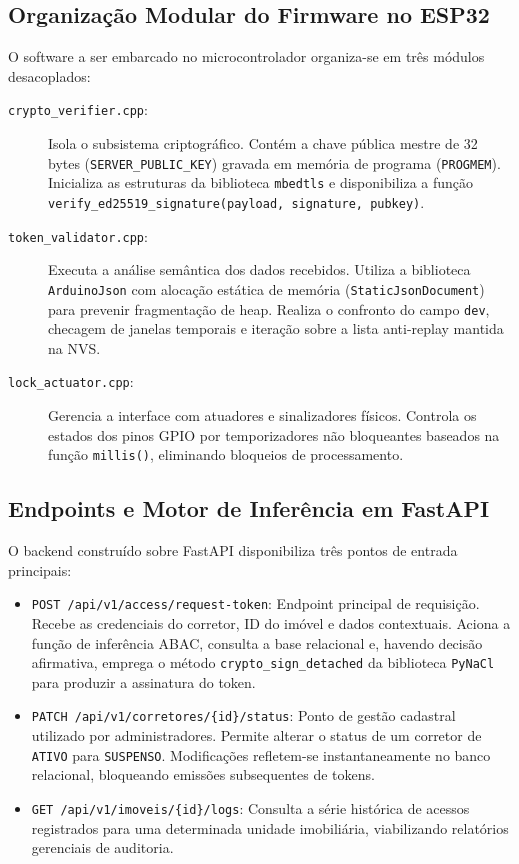 \subsection{Organização Modular do Firmware no ESP32}
\label{subsec:modulos-firmware}

O software a ser embarcado no microcontrolador organiza-se em três módulos desacoplados:

\begin{description}
    \item[\texttt{crypto\_verifier.cpp}:] Isola o subsistema criptográfico. Contém a chave pública mestre de 32 bytes (\texttt{SERVER\_PUBLIC\_KEY}) gravada em memória de programa (\texttt{PROGMEM}). Inicializa as estruturas da biblioteca \texttt{mbedtls} e disponibiliza a função \texttt{verify\_ed25519\_signature(payload, signature, pubkey)}.
    \item[\texttt{token\_validator.cpp}:] Executa a análise semântica dos dados recebidos. Utiliza a biblioteca \texttt{ArduinoJson} com alocação estática de memória (\texttt{StaticJsonDocument}) para prevenir fragmentação de heap. Realiza o confronto do campo \texttt{dev}, checagem de janelas temporais e iteração sobre a lista anti-replay mantida na NVS.
    \item[\texttt{lock\_actuator.cpp}:] Gerencia a interface com atuadores e sinalizadores físicos. Controla os estados dos pinos GPIO por temporizadores não bloqueantes baseados na função \texttt{millis()}, eliminando bloqueios de processamento.
\end{description}

\subsection{Endpoints e Motor de Inferência em FastAPI}
\label{subsec:endpoints-api}

O backend construído sobre FastAPI disponibiliza três pontos de entrada principais:

\begin{itemize}
    \item \texttt{POST /api/v1/access/request-token}: Endpoint principal de requisição. Recebe as credenciais do corretor, ID do imóvel e dados contextuais. Aciona a função de inferência ABAC, consulta a base relacional e, havendo decisão afirmativa, emprega o método \texttt{crypto\_sign\_detached} da biblioteca \texttt{PyNaCl} para produzir a assinatura do token.
    \item \texttt{PATCH /api/v1/corretores/\{id\}/status}: Ponto de gestão cadastral utilizado por administradores. Permite alterar o status de um corretor de \texttt{ATIVO} para \texttt{SUSPENSO}. Modificações refletem-se instantaneamente no banco relacional, bloqueando emissões subsequentes de tokens.
    \item \texttt{GET /api/v1/imoveis/\{id\}/logs}: Consulta a série histórica de acessos registrados para uma determinada unidade imobiliária, viabilizando relatórios gerenciais de auditoria.
\end{itemize}

